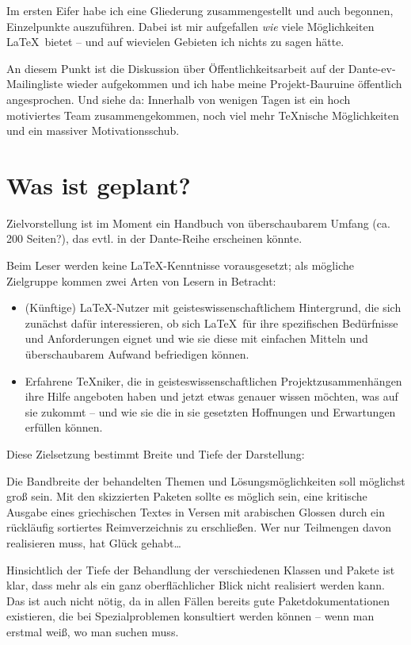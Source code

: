 \documentclass[ngerman]{dtk}
\begin{document}
Im ersten Eifer habe ich eine Gliederung zusammengestellt und auch begonnen, Einzelpunkte auszuführen.
Dabei ist mir aufgefallen \emph{wie} viele Möglichkeiten \LaTeX\ bietet -- und auf wievielen Gebieten ich nichts
zu sagen hätte.

An diesem Punkt ist die Diskussion über Öffentlichkeitsarbeit auf der Dante-ev-Mailingliste wieder aufgekommen
und ich habe meine Projekt-Bauruine öffentlich angesprochen. Und siehe da: Innerhalb von wenigen Tagen
ist ein hoch motiviertes Team zusammengekommen, noch viel mehr \TeX nische Möglichkeiten und ein
massiver Motivationsschub.


\section{Was ist geplant?}

Zielvorstellung ist im Moment ein Handbuch von überschaubarem Umfang (ca. 200 Seiten?), das evtl. in der 
Dante-Reihe erscheinen könnte.

Beim Leser werden keine \LaTeX -Kenntnisse vorausgesetzt; als mögliche Zielgruppe kommen zwei Arten von Lesern
in Betracht:

\begin{itemize}
    \item (Künftige) \LaTeX -Nutzer mit geisteswissenschaftlichem Hintergrund, die sich zunächst dafür
         interessieren, ob sich \LaTeX\ für ihre spezifischen Bedürfnisse und Anforderungen eignet und
         wie sie diese mit einfachen Mitteln und überschaubarem Aufwand befriedigen können.
    \item Erfahrene \TeX niker, die in geisteswissenschaftlichen Projektzusammenhängen ihre Hilfe angeboten
         haben und jetzt etwas genauer wissen möchten, was auf sie zukommt -- und wie sie die in sie
         gesetzten Hoffnungen und Erwartungen erfüllen können.
\end{itemize}

Diese Zielsetzung bestimmt Breite und Tiefe der Darstellung: 

Die Bandbreite der behandelten Themen und Lösungsmöglichkeiten soll möglichst groß sein.
Mit den skizzierten Paketen sollte es möglich sein, eine kritische Ausgabe eines griechischen Textes in Versen mit
arabischen Glossen durch ein rückläufig sortiertes Reimverzeichnis zu erschließen.
Wer nur Teilmengen davon realisieren muss, hat Glück gehabt\ldots

Hinsichtlich der Tiefe der Behandlung der verschiedenen Klassen und Pakete ist klar, dass mehr als ein
ganz oberflächlicher Blick nicht realisiert werden kann. Das ist auch nicht nötig, da in allen Fällen bereits
gute Paketdokumentationen existieren, die bei Spezialproblemen konsultiert werden können -- wenn man erstmal
weiß, wo man suchen muss.
\end{document}
